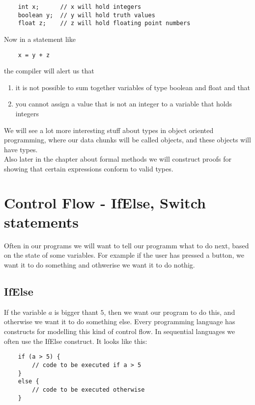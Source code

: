 \documentclass{scrreprt}
\begin{document}
\lstset{language=Java}
\begin{lstlisting}
	int x;		// x will hold integers
	boolean y; 	// y will hold truth values
	float z;	// z will hold floating point numbers
\end{lstlisting}

Now in a statement like
 \lstset{language=C}
\begin{lstlisting}
	x = y + z
\end{lstlisting}
the compiler will alert us that
\begin{enumerate}
	\item it is not possible to sum together variables of type boolean and float and that
	\item you cannot assign a value that is not an integer to a variable that holds integers
\end{enumerate}


We will see a lot more interesting stuff about types in object oriented programming, where our data chunks will be called objects, and these objects will have types. \\
Also later in the chapter about formal methods we will construct proofs for showing that certain expressions conform to valid types.


\section{Control Flow - IfElse, Switch statements}
Often in our programs we will want to tell our programm what to do next, based on the state of some variables. For example if the user has pressed a button, we want it to do something and othwerise we want it to do nothig.

\subsection{IfElse}
If the variable $a$ is bigger thant $5$, then we want our program to do this, and otherwise we want it to do something else. Every programming language has constructs for modelling this kind of control flow. In sequential languages we often use the IfElse construct. It looks like this:
\begin{lstlisting}
	if (a > 5) {
		// code to be executed if a > 5
	}
	else {
		// code to be executed otherwise
	}
\end{lstlisting}
\end{document}
